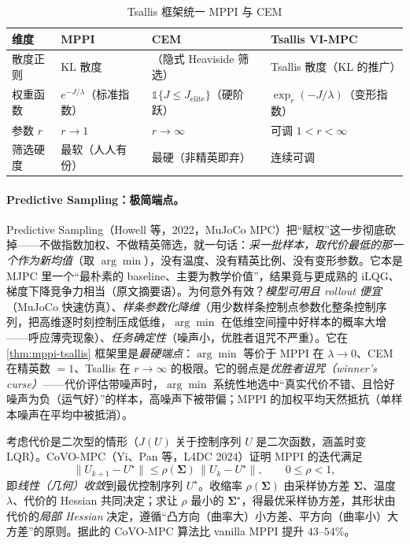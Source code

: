 \begin{table}[H]\centering\small
\caption{Tsallis 框架统一 MPPI 与 CEM}
\label{tab:mppi-tsallis}
\begin{tabular}{llll}
\toprule
维度 & MPPI & CEM & Tsallis VI-MPC \\
\midrule
散度正则 & KL 散度 & （隐式 Heaviside 筛选） & Tsallis 散度（KL 的推广） \\
权重函数 & $e^{-J/\lambda}$（标准指数） & $\mathbb{1}\{J\le J_{\mathrm{elite}}\}$（硬阶跃） & $\exp_r(-J/\lambda)$（变形指数） \\
参数 $r$ & $r\to1$ & $r\to\infty$ & 可调 $1<r<\infty$ \\
筛选硬度 & 最软（人人有份） & 最硬（非精英即弃） & 连续可调 \\
\bottomrule
\end{tabular}
\end{table}

\paragraph{Predictive Sampling：极简端点。}Predictive Sampling（Howell 等，2022，MuJoCo MPC）把“赋权”这一步彻底砍掉——不做指数加权、不做精英筛选，就一句话：\emph{采一批样本，取代价最低的那一个作为新均值}（取 $\arg\min$），没有温度、没有精英比例、没有变形参数\cite{howell2022predictive}。它本是 MJPC 里一个“最朴素的 baseline、主要为教学价值”，结果竟与更成熟的 iLQG、梯度下降竞争力相当（原文摘要语\cite{howell2022predictive}）。为何意外有效？\emph{模型可用且 rollout 便宜}（MuJoCo 快速仿真）、\emph{样条参数化降维}（用少数样条控制点参数化整条控制序列，把高维逐时刻控制压成低维，$\arg\min$ 在低维空间撞中好样本的概率大增——呼应薄壳现象）、\emph{任务确定性}（噪声小，优胜者诅咒不严重）。它在 \cref{thm:mppi-tsallis} 框架里是\emph{最硬端点}：$\arg\min$ 等价于 MPPI 在 $\lambda\to0$、CEM 在精英数 $=1$、Tsallis 在 $r\to\infty$ 的极限。它的弱点是\emph{优胜者诅咒（winner's curse）}——代价评估带噪声时，$\arg\min$ 系统性地选中“真实代价不错、且恰好噪声为负（运气好）”的样本，高噪声下被带偏；MPPI 的加权平均天然抵抗（单样本噪声在平均中被抵消）。

\begin{theorem}\label{thm:mppi-covo}
考虑代价是二次型的情形（$J(U)$ 关于控制序列 $U$ 是二次函数，涵盖时变 LQR）。CoVO-MPC（Yi、Pan 等，L4DC 2024）证明 MPPI 的迭代满足
\begin{equation}
  \|U_{k+1}-U^\star\|\le\rho(\boldsymbol{\Sigma})\,\|U_k-U^\star\|,\qquad 0\le\rho<1,
  \label{eq:mppi-covo}
\end{equation}
即\emph{线性（几何）收敛}到最优控制序列 $U^\star$。收缩率 $\rho(\boldsymbol{\Sigma})$ 由采样协方差 $\boldsymbol{\Sigma}$、温度 $\lambda$、代价的 Hessian 共同决定；求让 $\rho$ 最小的 $\boldsymbol{\Sigma}^\star$，得最优采样协方差，其形状由代价的\emph{局部 Hessian} 决定，遵循“凸方向（曲率大）小方差、平方向（曲率小）大方差”的原则。据此的 CoVO-MPC 算法比 vanilla MPPI 提升 $43$--$54\%$\cite{yi2024covo}。
\end{theorem}

